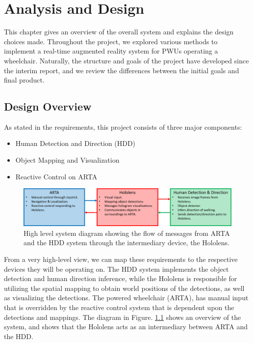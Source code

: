 \chapter{Analysis and Design} \label{chapter:4}
This chapter gives an overview of the overall system and explains the design choices made. Throughout the project, we explored various methods to implement a real-time augmented reality system for PWUs operating a wheelchair. Naturally, the structure and goals of the project have developed since the interim report, and we review the differences between the initial goals and final product.

\section{Design Overview}
As stated in the requirements, this project consists of three major components:
\begin{itemize}
    \item Human Detection and Direction (HDD)
    \item Object Mapping and Visualization
    \item Reactive Control on ARTA
\end{itemize}

\begin{figure}[ht]
    \centering
    \includegraphics[width=1.0\linewidth]{img/chapter4_analysis/simpleSystemDiagram.png}
    \caption{High level system diagram showing the flow of messages from ARTA and the HDD system through the intermediary device, the Hololens.}
    \label{fig:simplifiedHL}
\end{figure}

From a very high-level view, we can map these requirements to the respective devices they will be operating on. The HDD system implements the object detection and human direction inference, while the Hololens is responsible for utilizing the spatial mapping to obtain world positions of the detections, as well as visualizing the detections. The powered wheelchair (ARTA), has manual input that is overridden by the reactive control system that is dependent upon the detections and mappings. The diagram in Figure. \ref{fig:simplifiedHL} shows an overview of the system, and shows that the Hololens acts as an intermediary between ARTA and the HDD.

